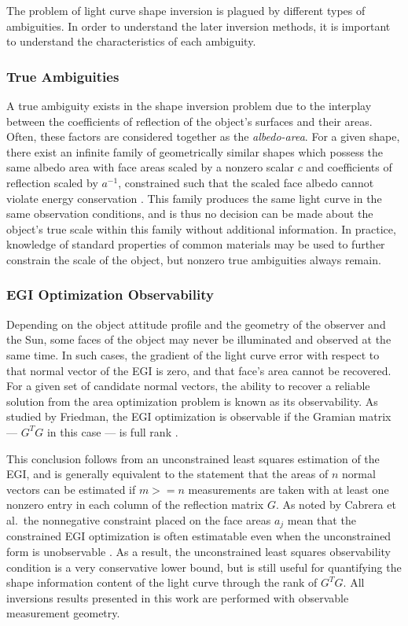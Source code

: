 The problem of light curve shape inversion is plagued by different types of ambiguities. In order to understand the later inversion methods, it is important to understand the characteristics of each ambiguity.

\subsubsection{True Ambiguities}

A true ambiguity exists in the shape inversion problem due to the interplay between the coefficients of reflection of the object's surfaces and their areas. Often, these factors are considered together as the \textit{albedo-area}. For a given shape, there exist an infinite family of geometrically similar shapes which possess the same albedo area with face areas scaled by a nonzero scalar $c$ and coefficients of reflection scaled by $a^{-1}$, constrained such that the scaled face albedo cannot violate energy conservation \cite{fan2020thesis}. This family produces the same light curve in the same observation conditions, and is thus no decision can be made about the object's true scale within this family without additional information. In practice, knowledge of standard properties of common materials may be used to further constrain the scale of the object, but nonzero true ambiguities always remain.

\subsubsection{EGI Optimization Observability}

Depending on the object attitude profile and the geometry of the observer and the Sun, some faces of the object may never be illuminated and observed at the same time. In such cases, the gradient of the light curve error with respect to that normal vector of the EGI is zero, and that face's area cannot be recovered. For a given set of candidate normal vectors, the ability to recover a reliable solution from the area optimization problem is known as its observability. As studied by Friedman, the EGI optimization is observable if the Gramian matrix --- $G^T G$ in this case --- is full rank \cite{friedman2020}.

This conclusion follows from an unconstrained least squares estimation of the EGI, and is generally equivalent to the statement that the areas of $n$ normal vectors can be estimated if $m>=n$ measurements are taken with at least one nonzero entry in each column of the reflection matrix $G$. As noted by Cabrera et al.\, the nonnegative constraint placed on the face areas $a_j$ mean that the constrained EGI optimization is often estimatable even when the unconstrained form is unobservable \cite{cabrera2021}. As a result, the unconstrained least squares observability condition is a very conservative lower bound, but is still useful for quantifying the shape information content of the light curve through the rank of $G^T G$. All inversions results presented in this work are performed with observable measurement geometry. 

